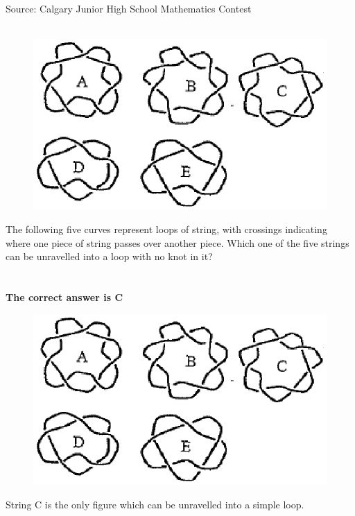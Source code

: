 \documentclass[12pt]{letter}
\begin{document}
\footnotesize{Source: Calgary Junior High School Mathematics Contest}\\ \\

\begin{figure}
  \begin{center}
    \includegraphics[scale=0.75]{CAJA98-07fig.eps}
  \end{center}
\end{figure}
\large
The following five curves represent loops of string, with crossings indicating where one piece of string passes over another piece. Which one of the five strings can be unravelled into a loop with no knot in it?	 \\ \\ \\

\textbf{The correct answer is C} 

\begin{figure}
  \begin{center}
    \includegraphics[scale=0.75]{CAJA98-07fig.eps}
  \end{center}
\end{figure}
String C is the only figure which can be unravelled into a simple loop. 
\pagebreak
\end{document}
